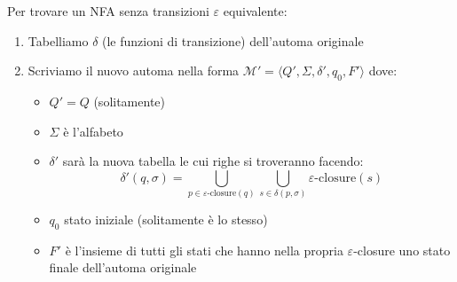 \documentclass[12pt, a4paper]{report}
\begin{document}
                \begin{algorithm}
                    Per trovare un NFA senza transizioni $\varepsilon$ equivalente:
                    \begin{enumerate}
                        \item Tabelliamo $\delta$ (le funzioni di transizione) dell'automa originale
                        \item Scriviamo il nuovo automa nella forma $\mathcal{M'}=\langle Q',\Sigma,\delta',q_0,F'\rangle$ dove: \begin{itemize}
                            \item $Q'=Q$ (solitamente)
                            \item $\Sigma$ è l'alfabeto
                            \item $\delta'$ sarà la nuova tabella le cui righe si troveranno facendo: $$\delta'(q,\sigma)=\bigcup_{p\in\varepsilon\text{-closure}(q)}\bigcup_{s\in\delta(p,\sigma)}\varepsilon\text{-closure}(s)$$
                            \item $q_0$ stato iniziale (solitamente è lo stesso)
                            \item $F'$ è l'insieme di tutti gli stati che hanno nella propria $\varepsilon$-closure uno stato finale dell'automa originale
                        \end{itemize}
                    \end{enumerate}
                \end{algorithm}
\end{document}

